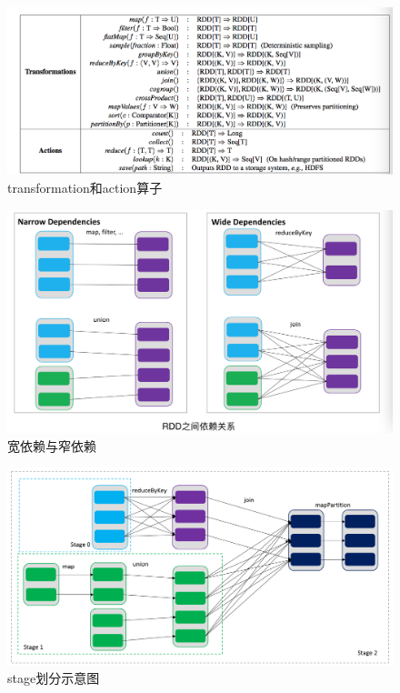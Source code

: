 \begin{figure}[htbp]
    \centering
    \includegraphics[width=1\textwidth]{Img/rdd-transformations-actions.png}
    \caption{transformation和action算子}
    \label{fig:rdd-transformation-action}
\end{figure}

\begin{figure}[htbp]
    \centering
    \includegraphics[width=1\textwidth]{Img/rdd-dependency.png}
    \caption{宽依赖与窄依赖}
    \label{fig:rdd-dependency}
\end{figure}


\begin{figure}[htbp]
    \centering
    \includegraphics[width=1\textwidth]{Img/rdd-dag.png}
    \caption{stage划分示意图}
    \label{fig:rdd-dag-stage}
\end{figure}

